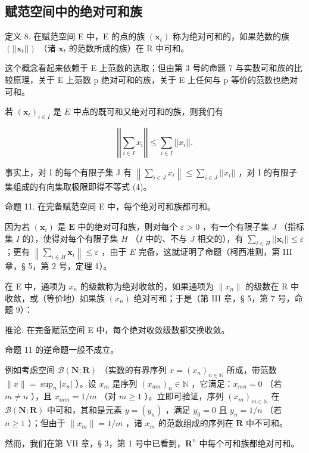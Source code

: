 \subsection{赋范空间中的绝对可和族}

定义 8. 在赋范空间 E 中，E 的点的族 \((\pmb{x}_{t})\) 称为绝对可和的，如果范数的族 \((||\pmb{x}_{t}||)\) （诸 \(\pmb{x}_{t}\) 的范数所成的族）在 R 中可和。

这个概念看起来依赖于 E 上范数的选取；但由第 3 号的命题 7 与实数可和族的比较原理，关于 E 上范数 p 绝对可和的族，关于 E 上任何与 p 等价的范数也绝对可和。

若 \((\pmb{x}_t)_{i\in I}\) 是 \(E\) 中点的既可和又绝对可和的族，则我们有

\[
\left| \left| \sum_ {i \in I} x _ {i} \right| \right| \leqslant \sum_ {i \in I} | | x _ {i} | |.\tag{4}
\]

事实上，对 I 的每个有限子集 J 有 \(\left\|\sum_{i\in J}x_{i}\right\| \leqslant \sum_{i\in J}||x_{i}||\) ，对 I 的有限子集组成的有向集取极限即得不等式 (4)。

命题 11. 在完备赋范空间 E 中，每个绝对可和族都可和。

因为若 \((\pmb{x}_i)\) 是 \(\mathbf{E}\) 中的绝对可和族，则对每个 \(\varepsilon > 0\) ，有一个有限子集 \(J\) （指标集 \(I\) 的），使得对每个有限子集 \(H\) （\(I\) 中的、不与 \(J\) 相交的），有 \(\sum_{i \in H} ||\pmb{x}_i|| \leqslant \varepsilon\) ；更有 \(\left\| \sum_{i \in H} \pmb{x}_i \right\| \leqslant \varepsilon\) ，由于 \(E\) 完备，这就证明了命题（柯西准则，第 III 章，§ 5，第 2 号，定理 1）。

在 E 中，通项为 \(x_{n}\) 的级数称为绝对收敛的，如果通项为 \(\|x_{n}\|\) 的级数在 R 中收敛，或（等价地）如果族 \((x_{n})\) 绝对可和；于是（第 III 章，§ 5，第 7 号，命题 9）：

推论. 在完备赋范空间 E 中，每个绝对收敛级数都交换收敛。

命题 11 的逆命题一般不成立。

例如考虑空间 \(\mathcal{B}(\mathbf{N};\mathbf{R})\) （实数的有界序列 \(x = (x_{n})_{n\in \mathbb{N}}\) 所成，带范数 \(\| x\| = \sup_n |x_n|\) ）。设 \(x_{m}\) 是序列 \((x_{mn})_n\in \mathbb{N}\) ，它满足：\(x_{mn} = 0\) （若 \(m\neq n\) ），且 \(x_{mm} = 1 / m\) （对 \(m\geqslant 1\) ）。立即可验证，序列 \((x_m)_{m\in \mathbb{N}}\) 在 \(\mathcal{B}(\mathbf{N};\mathbf{R})\) 中可和，其和是元素 \(y = (y_{n})\) ，满足 \(y_0 = 0\) 且 \(y_{n} = 1 / n\) （若 \(n\geqslant 1\) ）；但由于 \(\| x_m\| = 1 / m\) ，诸 \(x_{m}\) 的范数组成的序列在 \(\mathbf{R}\) 中不可和。

然而，我们在第 VII 章，§ 3，第 1 号中已看到，\(\mathbf{R}^n\) 中每个可和族都绝对可和。

